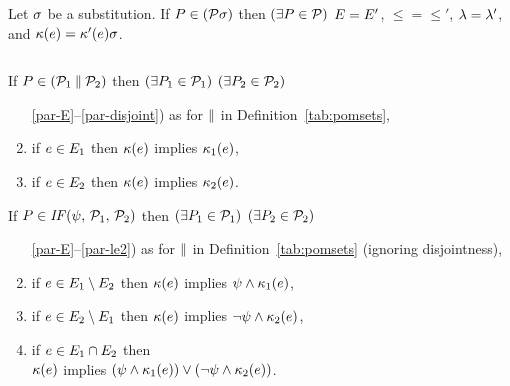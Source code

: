 \begin{definition}
  Let $\aSub$ be a substitution.  If $\aPS\in(\aPSS\aSub)$ then
  $(\exists\aPS\in\aPSS)$ $\Event = \Event'$, ${\le} = {\le'}$,
  $\labelingAct = \labelingAct'$, and
  $\labelingForm(\aEv) = \labelingForm'(\aEv)\aSub$.
\end{definition}

\begin{definition}$\phantom{\;}$\par
  \label{tab:pomsets-pre}
  


  \noindent
  If $\aPS\SB0 \in (\aPSS_1\sPAR\aPSS_2)$ then
  $(\exists\aPS_1\in\aPSS_1)$ $(\exists\aPS_2\in\aPSS_2)$
  \begin{enumerate}
    \setcounter{enumi}{\value{pomsetParDisjointCount}}
  \item[\ref{par-E}--\ref{par-disjoint})]
    as for $\sPAR$ in Definition~\ref{tab:pomsets},
  \item \label{par-kappa1}
    if $\aEv\in\aEvs_1$ then $\labelingForm\SB0(\aEv)$ implies $\labelingForm_1(\aEv)$,
  \item \label{par-kappa2}
    if $\aEv\in\aEvs_2$ then $\labelingForm\SB0(\aEv)$ implies $\labelingForm_2(\aEv)$.
    \setcounter{pomsetPreParCount}{\value{enumi}}
  \end{enumerate}

  \noindent
  If $\aPS\SB0 \in \sIF{\bForm}\sTHEN\aPSS_1\sELSE\aPSS_2\sFI$ then
  $(\exists\aPS_1\in\aPSS_1)$ $(\exists\aPS_2\in\aPSS_2)$
  \begin{enumerate}
    \setcounter{enumi}{\value{pomsetParCount}}
  \item[\ref{par-E}--\ref{par-le2})] 
    as for $\sPAR$  in Definition~\ref{tab:pomsets} (ignoring disjointness),
  \item \label{if-kappa1}
    if $\aEv\in\aEvs_1\setminus\aEvs_2$ then $\labelingForm\SB0(\aEv)$ implies $\bForm\land\labelingForm_1(\aEv)$,
  \item \label{if-kappa2}
    if $\aEv\in\aEvs_2\setminus\aEvs_1$ then $\labelingForm\SB0(\aEv)$ implies $\neg\bForm\land\labelingForm_2(\aEv)$, 
  \item \label{if-kappa12}
    if $\aEv\in\aEvs_1\cap\aEvs_2$ then\\ $\labelingForm\SB0(\aEv)$ implies $(\bForm\land\labelingForm_1(\aEv))\lor(\neg\bForm\land\labelingForm_2(\aEv))$.
    \setcounter{pomsetPreIfCount}{\value{enumi}}
  \end{enumerate}


\end{definition}
